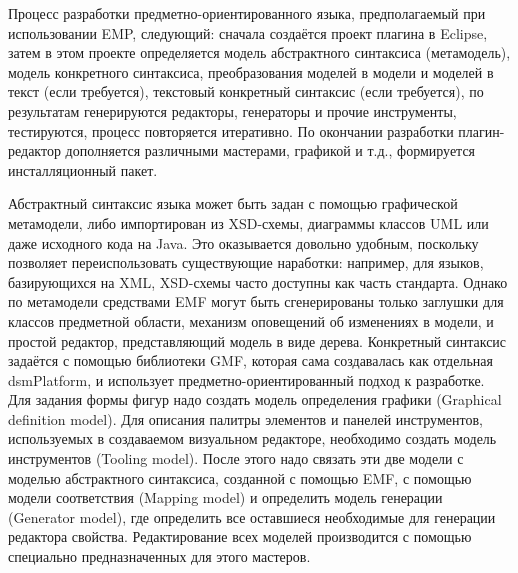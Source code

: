 Процесс разработки предметно-ориентированного языка, предполагаемый при использовании EMP, 
следующий: сначала создаётся проект плагина в Eclipse, затем в этом проекте определяется 
модель абстрактного синтаксиса (метамодель), модель конкретного синтаксиса, преобразования 
моделей в модели и моделей в текст (если требуется), текстовый конкретный синтаксис 
(если требуется), по результатам генерируются редакторы, генераторы и прочие инструменты, 
тестируются, процесс повторяется итеративно. По окончании разработки плагин-редактор 
дополняется различными мастерами, графикой и т.д., формируется инсталляционный пакет.

Абстрактный синтаксис языка может быть задан с помощью графической метамодели, либо 
импортирован из XSD-схемы, диаграммы классов UML или даже исходного кода на Java. 
Это оказывается довольно удобным, поскольку позволяет переиспользовать существующие 
наработки: например, для языков, базирующихся на XML, XSD-схемы часто доступны как 
часть стандарта. Однако по метамодели средствами EMF могут быть сгенерированы только 
заглушки для классов предметной области, механизм оповещений об изменениях в модели, 
и простой редактор, представляющий модель в виде дерева. Конкретный синтаксис задаётся
с помощью библиотеки GMF, которая сама создавалась как отдельная \ac{dsmPlatform}, и использует 
предметно-ориентированный подход к разработке. Для задания формы фигур надо создать 
модель определения графики (Graphical definition model). Для описания палитры элементов 
и панелей инструментов, используемых в создаваемом визуальном редакторе, необходимо 
создать модель инструментов (Tooling model). После этого надо связать эти две модели 
с моделью абстрактного синтаксиса, созданной с помощью EMF, с помощью модели соответствия 
(Mapping model) и определить модель генерации (Generator model), где определить все 
оставшиеся необходимые для генерации редактора свойства. Редактирование всех моделей 
производится с помощью специально предназначенных для этого мастеров.

